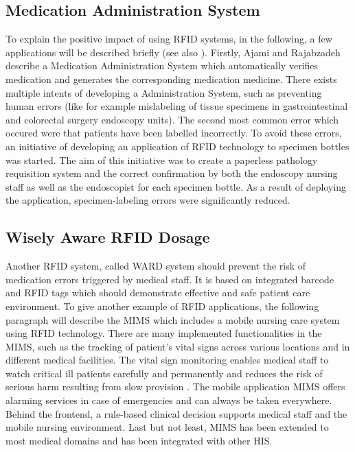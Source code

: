 \subsection{Medication Administration System}

To explain the positive impact of using RFID systems, in the following, a few applications will be described briefly (see also \cite{ncbi}). Firstly, Ajami and Rajabzadeh describe a Medication Administration System which automatically verifies medication and generates the corresponding medication medicine. There exists multiple intents of developing a Administration System, such as preventing human errors (like for example mislabeling of tissue specimens in gastrointestinal and colorectal surgery endoscopy units). The second most common error which occured were that patients have been labelled incorrectly. To avoid these errors, an initiative of developing an application of RFID technology to specimen bottles was started. The aim of this initiative was to create a paperless pathology requisition system and the correct confirmation by both the endoscopy nursing staff as well as the endoscopist for each specimen bottle. As a result of deploying the application, specimen-labeling errors were significantly reduced.

\subsection{Wisely Aware RFID Dosage}

Another RFID system, called \ac{WARD} system should prevent the risk of medication errors triggered by medical staff. It is based on integrated barcode and RFID tags which should demonstrate effective and safe patient care environment. 
To give another example of RFID applications, the following paragraph will describe the \ac{MIMS} which includes a mobile nursing care system using RFID technology. There are many implemented functionalities in the MIMS, such as the tracking of patient's vital signs across various locations and in different medical facilities. The vital sign monitoring enables medical staff to watch critical ill patients carefully and permanently and reduces the risk of serious harm resulting from slow provision \cite{ncbi}. The mobile application MIMS offers alarming services in case of emergencies and can always be taken everywhere. Behind the frontend, a rule-based clinical decision supports medical staff and the mobile nursing environment. Last but not least, MIMS has been extended to most medical domains and has been integrated with other HIS.

